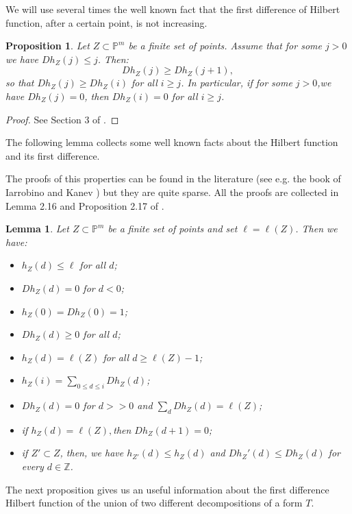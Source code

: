 \documentclass[a4paper,10pt,oneside]{article}
\theoremstyle{casep}
\newcommand{\Z}{\mathbb{Z}}
\newcommand{\Pj}{\mathbb{P}}
\newtheorem{proposition}[theorem]{Proposition}
\newtheorem{lemma}[theorem]{Lemma}
\theoremstyle{definition}
\begin{document}
We will use several times the well known fact that the first difference of Hilbert function, after a certain point, is not increasing.

\begin{proposition}\label{nonincr}
Let $ Z \subset \Pj^m $ be a finite set of points. Assume that for some $j>0$ we have $Dh_Z(j) \leq j$. Then:
$$ Dh_Z(j) \geq Dh_Z(j+1), $$
so that $ Dh_Z(j) \geq Dh_Z(i) $ for all $i\geq j$.
In particular, if for some $j>0$,we have $Dh_Z(j)=0 $, then $Dh_Z(i)=0$ for all $i\geq j$.
\end{proposition}
\begin{proof} See Section 3 of \cite{tre}. 


\end{proof}


The following lemma collects some well known facts about the Hilbert function and its first difference. 

The proofs of this properties can be found in the literature (see e.g. the book of Iarrobino and Kanev \cite{ventitre}) but they are quite sparse. All the proofs are collected in Lemma 2.16 and Proposition 2.17 of \cite{uno}.

\begin{lemma} Let $ Z \subset \Pj^m$ be a finite set of points and set $\ell= \ell(Z)$. Then we have:
\begin{itemize}
\item[1)] $h_Z(d) \leq \ell$ for all $d$;
\item[2)] $Dh_Z(d)=0$ for $d<0$;
\item[3)] $h_Z(0) = Dh_Z(0) = 1$; 
\item[4)] $Dh_Z(d) \geq 0 $ for all $d$;
\item[5)] $h_Z(d) = \ell(Z)$ for all $d \geq \ell(Z)- 1$;
\item[6)] $h_Z(i) = \sum_{0\leq d\leq i} Dh_Z(d)$;
\item[7)] $Dh_Z(d) = 0$ for $d >> 0$ and $\sum_d Dh_Z(d) = \ell(Z)$;
\item[8)] if $h_Z(d) = \ell(Z), $then $Dh_Z(d + 1) = 0$;
\item[9)] if $Z' \subset Z$, then, we have $h_{Z'} (d) \leq h_Z(d)$ and $Dh_Z' (d) \leq Dh_Z(d)$ for every $d \in \Z$.
\end{itemize}
\label{lemma:mix}
\end{lemma}

 The next proposition gives us an useful information about the first difference Hilbert function of the union of two different decompositions of a form $T$.
\end{document}

